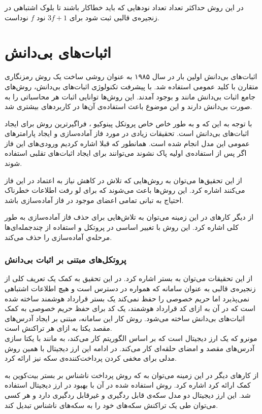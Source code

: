  \par
 در این روش حداکثر تعداد تعداد نود‌هایی که باید خطاکار باشند تا بلوک اشتباهی در زنجیره‌ی قالبی ثبت شود برای 
 $3f + 1$
 نود $f$ نود‌است.
 
\section{اثبات‌های بی‌دانش}
اثبات‌های بی‌دانش اولین بار در سال ۱۹۸۵ 
\cite{GHY}
به عنوان روشی ساخت یک روش رمزنگاری متقارن با کلید عمومی استفاده شد. با پیشرفت تکنولوژی اثبات‌های بی‌دانش،‌ روش‌های جامع اثبات بی‌دانش مانند
\cite{zksnark}
و  
\cite{zkstark}
بوجود آمدند. این روش‌ها توانایی اثبات هر محاسباتی را به صورت بی‌دانش دارند و این موضوع باعث استفاده‌ی آن‌ها در کاربردهای بیشتری شد.
\par
با توجه به این که 
 و به طور خاص خاص پروتکل پینوکیو
،
فراگیرترین روش برای ایجاد اثبات‌های بی‌دانش است. تحقیقات زیادی در مورد فاز آماده‌سازی و ایجاد پارامترهای عمومی این مدل انجام شده است. همانطور که قبلا اشاره کردیم ورودی‌های این فاز اگر پس از استفاده‌ی اولیه پاک نشوند می‌توانند برای ایجاد اثبات‌های تقلبی استفاده شوند.
\par
از این تحقیق‌ها می‌توان به روش‌هایی
\cite{znsetup} \cite{multipartyparams}
که تلاش در کاهش نیاز به اعتماد در این فاز می‌کنند اشاره کرد. این روش‌ها باعث می‌شوند که برای لو رفت اطلاعات خطرناک احتیاج به تبانی تمامی اعضای موجود در فاز آماده‌سازی باشد.
\par
از دیگر کارهای در این زمینه می‌توان به تلاش‌هایی برای حذف فاز آماده‌سازی به طور کلی اشاره کرد. این روش‌ با تغییر اساسی در پروتکل و استفاده از چندجمله‌ای‌ها 
\cite{nosetup}
مرحله‌ي آماده‌سازی را حذف می‌کند.
 
\subsubsection{پروتکل‌های مبتنی بر اثبات‌ بی‌دانش}
از این تحقیقات می‌توان به بستر 
\cite{hawk}
اشاره کرد. در این تحقیق به کمک یک تعریف کلی از زنجیره‌ی قالبی به عنوان سامانه که همواره در دسترس است و هیچ اطلاعات اشتباهی نمی‌پذیرد اما حریم خصوصی را حفظ نمی‌کند یک بستر قرارداد هوشمند ساخته شده است که در آن به ازای کد قرارداد هوشمند، یک کد برای حفظ حریم خصوصی به کمک اثبات‌های بی‌دانش ساخته می‌شود. روش کار این سامانه‌، مبتنی بر ایجاد آدرس‌های مقصد یکتا به ازای هر تراکنش است. 
\\
مونرو 
که یک ارز دیجیتال است که بر اساس الگوریتم 
\cite{monero}
کار می‌کند، به مانند 
با یکتا سازی آدرس‌های مقصد و امضای حلقه‌ای 
کار می‌کند. در ادامه این ارز دیجیتال با همین روش مدلی 
\cite{monero2}
برای مخفی کردن پرداخت‌کننده‌ی سکه نیز ارائه کرد.
\par
از کارهای دیگر در این زمینه‌ می‌توان به 
\cite{zerocoin}
که روش پرداخت ناشناس بر بستر بیت‌کوین به کمک 
ارائه کرد اشاره کرد. روش استفاده شده در آن با بهبود در ارز دیجیتال 
\cite{zerocash}
استفاده شد. این ارز دیجیتال دو مدل سکه‌ی قابل ردگیری و غیرقابل ردگیری دارد و هر کسی می‌توان طی یک تراکنش سکه‌های خود را به سکه‌های ناشناس تبدیل کند.



